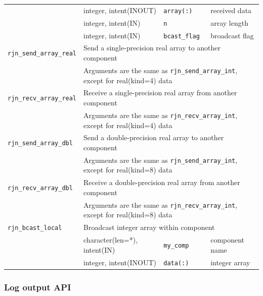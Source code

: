\documentclass[11pt,a4paper]{report}
\begin{document}
\begin{table}[H]
\begin{center}
{\begin{tabular}{llll}
           & integer, intent(INOUT) & \texttt{array(:)} & received data\\
           & integer, intent(IN) & \texttt{n} & array length\\
           & integer, intent(IN) & \texttt{bcast\_flag} & broadcast flag\\
\hline
 \texttt{rjn\_send\_array\_real} &  \multicolumn{3}{l}{Send a single-precision real array to another component}\\
           & \multicolumn{3}{l}{Arguments are the same as \texttt{rjn\_send\_array\_int}, except for real(kind=4) data}\\
\hline
 \texttt{rjn\_recv\_array\_real} &  \multicolumn{3}{l}{Receive a single-precision real array from another component}\\
           & \multicolumn{3}{l}{Arguments are the same as \texttt{rjn\_recv\_array\_int}, except for real(kind=4) data}\\
\hline
 \texttt{rjn\_send\_array\_dbl} &  \multicolumn{3}{l}{Send a double-precision real array to another component}\\
           & \multicolumn{3}{l}{Arguments are the same as \texttt{rjn\_send\_array\_int}, except for real(kind=8) data}\\
\hline
 \texttt{rjn\_recv\_array\_dbl} &  \multicolumn{3}{l}{Receive a double-precision real array from another component}\\
           & \multicolumn{3}{l}{Arguments are the same as \texttt{rjn\_recv\_array\_int}, except for real(kind=8) data}\\
\hline
 \texttt{rjn\_bcast\_local} &  \multicolumn{3}{l}{Broadcast integer array within component}\\
           &  character(len=*), intent(IN) & \texttt{my\_comp}  & component name\\
           &  integer, intent(INOUT) & \texttt{data(:)} & integer array\\
\hline\hline
\end{tabular}
}
\end{center}
\end{table}


\subsubsection{Log output API}
\end{document}
